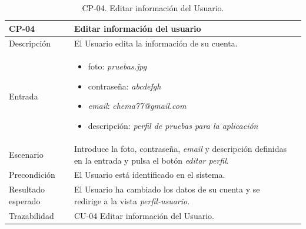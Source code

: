         \begin{table}[]
            \centering
            \begin{tabularx}{1\textwidth} { 
                | >{\raggedright\arraybackslash}X 
                | >{\raggedright\arraybackslash}X 
                | >{\raggedright\arraybackslash}X
                |  }
            \hline
            \textbf{CP-04}     & \textbf{Editar información del usuario}                             \\ \hline
            Descripción        & El Usuario edita la información de su cuenta.      \\ \hline
            Entrada            & \begin{itemize}
                \item foto: \textit{pruebas.jpg}
                \item contraseña: \textit{abcdefgh}
                \item \textit{email}: \textit{chema77@gmail.com}
                \item descripción: \textit{perfil de pruebas para la aplicación}
            \end{itemize} \\ \hline
            Escenario          & Introduce la foto, contraseña, \textit{email} y descripción definidas en la entrada y pulsa el botón \textit{editar perfil}.                            \\ \hline
            Precondición          & El Usuario está identificado en el sistema.                             \\ \hline
           
            Resultado esperado & El Usuario ha cambiado los datos de su cuenta y se redirige a la vista \textit{perfil-usuario}. \\ \hline
            Trazabilidad & CU-04 Editar información del Usuario. \\ \hline
        \end{tabularx}
        \caption{CP-04. Editar información del Usuario.}
        \label{table:CP-04}
            \end{table}

\clearpage

